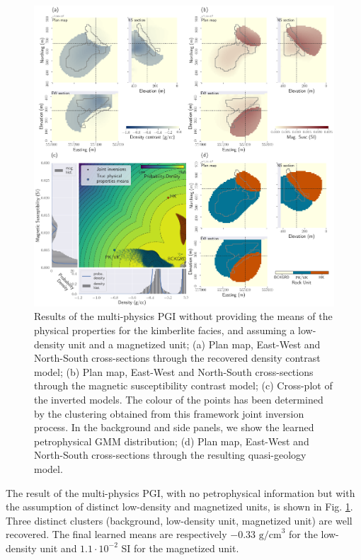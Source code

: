 \documentclass[extra, mreferee]{gji_joint} %
\begin{document}
\begin{figure}
    \centering
    \includegraphics[width=\textwidth]{Fig/LowRes/TKC_NoPrior3ClustersAssumption_Synthetic.png}
    \caption{Results of the multi-physics PGI without providing the means of the physical properties for the kimberlite facies, and assuming a low-density unit and a magnetized unit; (a) Plan map, East-West and North-South cross-sections through the recovered density contrast model; (b) Plan map, East-West and North-South cross-sections through the magnetic susceptibility contrast model; (c) Cross-plot of the inverted models. The colour of the points has been determined by the clustering obtained from this framework joint inversion process. In the background and side panels, we show the learned petrophysical GMM distribution; (d) Plan map, East-West and North-South cross-sections through the resulting quasi-geology model.}
    \label{fig:TKC_NoPrior3ClustersAssumption_Synthetic.png}
\end{figure}

The result of the multi-physics PGI, with no petrophysical information but with the assumption of distinct low-density and magnetized units, is shown in Fig. \ref{fig:TKC_NoPrior3ClustersAssumption_Synthetic.png}. Three distinct clusters (background, low-density unit, magnetized unit) are well recovered. The final learned means are respectively $-0.33 \text{ g/cm}^3$ for the low-density unit and $1.1 \cdot10^{-2}$ SI for the magnetized unit.
\end{document}
